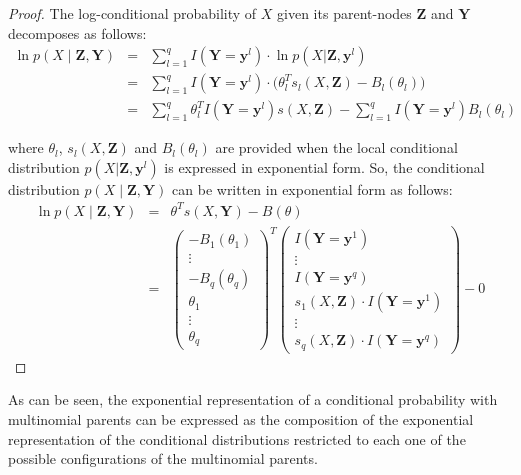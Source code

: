 \documentclass[11pt, oneside]{article}   	%
\newcommand{\bm}{\mathbf}
\numberwithin{figure}{section}
\numberwithin{equation}{section}
\numberwithin{table}{section}
\theoremstyle{definition}
\begin{document}
\begin{proof}

The log-conditional probability of $X$ given its parent-nodes $\bm Z$ and $\mathbf{Y}$ decomposes as  follows:
\begin{eqnarray*}
\ln p(X \mid \bm Z, \bm Y) &=&  \sum_{l=1}^q I(\mathbf{Y} =\mathbf{y}^l) \cdot \ln p(X | \bm Z, \mathbf{y}^l) \\
&=& \sum_{l=1}^q I(\mathbf{Y} =\mathbf{y}^l) \cdot \Big(  \theta_{l}^T s_l(X, \bm Z)  -  B_l(\theta_{l}) \Big)\\
&=& \sum_{l=1}^q \theta_{l}^T  I(\mathbf{Y} =\mathbf{y}^l) s(X, \bm Z) - \sum_{l=1}^q I(\mathbf{Y} =\mathbf{y}^l) B_l(\theta_{l})
\end{eqnarray*}

\noindent where $\theta_l$, $s_l(X,\bm Z)$ and $B_l(\theta_l)$ are provided when the local conditional distribution $p(X | \bm Z, \mathbf{y}^l)$ is expressed in exponential form. So, the conditional distribution $p(X \mid \bm Z, \bm Y)$ can be written in exponential form as follows: 
\begin{eqnarray}
\label{Equation:CD_With_MParents:Representation}
\ln p(X \mid \bm Z, \bm Y)  &=& \theta^T s(X,\mathbf{Y}) - B(\theta) \nonumber \\
&=&
\begin{pmatrix}
- B_1(\theta_{1}) \\
\vdots \\
- B_q(\theta_{q}) \\
\theta_{1} \\
\vdots \\
\theta_{q}
\end{pmatrix}^T
\begin{pmatrix}
I(\mathbf{Y} =\mathbf{y}^1) \\
\vdots \\
I(\mathbf{Y} =\mathbf{y}^q) \\
s_1(X, \bm Z) \cdot I(\mathbf{Y} =\mathbf{y}^1) \\
\vdots \\
s_q(X, \bm Z) \cdot I(\mathbf{Y} =\mathbf{y}^q)
\end{pmatrix}
- 0 
\end{eqnarray}
\end{proof}


As can be seen, the exponential representation of a conditional probability with multinomial parents can be expressed as the composition of the exponential representation of the conditional distributions restricted to each one of the possible configurations of the multinomial parents. 
\end{document}

